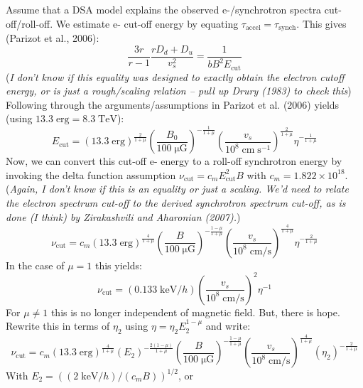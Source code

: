 \documentclass[iop, apj, numberedappendix]{emulateapj}
\newcommand*{\mt}{\mathrm}
\newcommand*{\unit}[1]{\;\mt{#1}}  %
\newcommand*{\Ecut}{E_{\mt{cut}}}
\newcommand*{\muG}{\unit{\mu G}}
\begin{document}
Assume that a DSA model explains the observed e-/synchrotron spectra
cut-off/roll-off.  We estimate e- cut-off energy by equating
$\tau_{\mt{accel}} = \tau_{\mt{synch}}$.  This gives (Parizot et al., 2006):
\begin{equation}
    \frac{3r}{r-1} \frac{r D_d + D_u}{v_s^2} = \frac{1}{b B^2 \Ecut}
\end{equation}
(\emph{I don't know if this equality was designed to exactly obtain the electron
cutoff energy, or is just a rough/scaling relation -- pull up Drury (1983) to
check this})
Following through the arguments/assumptions in Parizot et al. (2006) yields
(using $13.3 \unit{erg} = 8.3 \unit{TeV}$):
\begin{equation}
    \Ecut =
        \left( 13.3 \unit{erg} \right)^{\frac{2}{1+\mu}}
        \left( \frac{B_0}{100 \muG} \right)^{-\frac{1}{1+\mu}}
        \left( \frac{v_s}{10^8 \unit{cm\;s^{-1}}} \right)^{\frac{2}{1+\mu}}
        \eta^{-\frac{1}{1+\mu}}
\end{equation}
Now, we can convert this cut-off e- energy to a roll-off synchrotron energy by
invoking the delta function assumption $\nu_{\mt{cut}} = c_m \Ecut^2 B$ with
$c_m = 1.822 \times 10^{18}$.
(\emph{Again, I don't know if this is an equality or just a scaling.  We'd need
to relate the electron spectrum cut-off to the derived synchrotron spectrum
cut-off, as is done (I think) by Zirakashvili and Aharonian (2007).})
\begin{equation}
    \nu_{\mt{cut}} = c_m
        \left( 13.3 \unit{erg} \right)^{\frac{4}{1+\mu}}
        \left( \frac{B}{100\muG} \right)^{-\frac{1-\mu}{1+\mu}}
        \left( \frac{v_s}{10^8 \unit{cm/s}} \right)^{\frac{4}{1+\mu}}
        \eta^{-\frac{2}{1+\mu}}
\end{equation}
In the case of $\mu = 1$ this yields:
\begin{equation}
    \nu_{\mt{cut}} = (0.133 \unit{keV} / h)
        \left( \frac{v_s}{10^8 \unit{cm/s}} \right)^{2}
        \eta^{-1}
\end{equation}
For $\mu \neq 1$ this is no longer independent of magnetic field.  But,
there is hope.  Rewrite this in terms of $\eta_2$ using
$\eta = \eta_2 E_2^{1-\mu}$ and write:
\[
    \nu_{\mt{cut}} = c_m
        \left( 13.3 \unit{erg} \right)^{\frac{4}{1+\mu}}
        \left( E_2 \right)^{-\frac{2(1-\mu)}{1+\mu}}
        \left( \frac{B}{100\muG} \right)^{-\frac{1-\mu}{1+\mu}}
        \left( \frac{v_s}{10^8 \unit{cm/s}} \right)^{\frac{4}{1+\mu}}
        \left( \eta_2 \right)^{-\frac{2}{1+\mu}}
\]
With $E_2 = \left( (2 \unit{keV}/h) / (c_m B) \right)^{1/2}$, or
\end{document}

